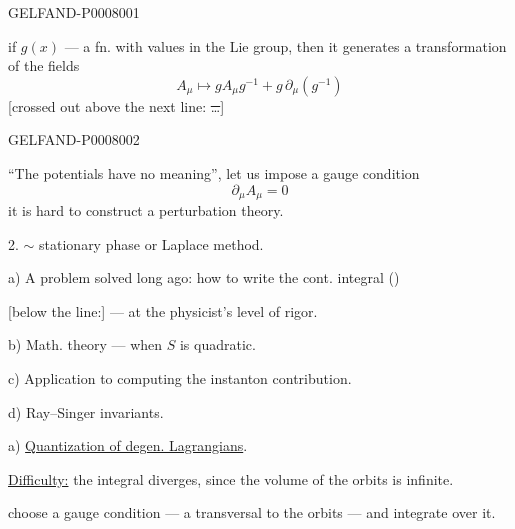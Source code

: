 \begin{GelfandAdjacentEvidence}{GELFAND-P000800}{1}


if \(g(x)\) --- a fn. with values in the Lie group,
then it generates a transformation of the fields
\begin{equation*}
A_\mu\mapsto g A_\mu g^{-1}+g\,\partial_\mu(g^{-1})
\tag{6}
\end{equation*}
[crossed out above the next line: \sout{\ldots}]
\end{GelfandAdjacentEvidence}
\begin{GelfandAdjacentEvidence}{GELFAND-P000800}{2}



“The potentials have no meaning”, let us impose a gauge condition
\begin{equation*}
\partial_\mu A_\mu=0
\tag{7}
\end{equation*}
 it is hard to construct a perturbation theory.

2.  \(\sim\) stationary phase or Laplace method.

a) A problem solved long ago: how to write the cont. integral ()

[below the line:] --- at the physicist’s level of rigor.

b) Math. theory --- when \(S\) is quadratic.

c) Application to computing the instanton contribution.

d) Ray–Singer invariants.

a) \underline{Quantization of degen. Lagrangians}.

\uline{Difficulty:} the integral diverges, since the volume of the orbits is infinite.

 choose a gauge condition --- a transversal to the orbits --- and integrate over it.

\end{GelfandAdjacentEvidence}
